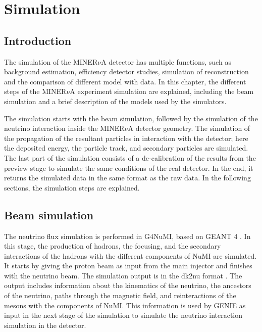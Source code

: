 \chapter{Simulation}
\minitoc
\label{Cap:Simulation}

\section{Introduction}
\label{Cap:Simulation:Introduction}
The simulation of the MINER$\nu$A detector has multiple functions, such as background estimation, efficiency detector studies, simulation of reconstruction and the comparison of different  model with data. In this chapter, the different steps of the MINER$\nu$A experiment simulation are explained, including the beam simulation and a brief description of the models used by the simulators.

The simulation starts with the beam simulation, followed by the simulation of the neutrino interaction inside the MINER$\nu$A detector geometry. The simulation of the propagation of the resultant particles in interaction with the detector; here the deposited energy, the particle track, and secondary particles are simulated. The last part of the simulation consists of a de-calibration of the results from the preview stage to simulate the same conditions of the real detector. In the end, it returns the simulated data in the same format as the raw data. In the following sections, the simulation steps are explained.

\section{Beam simulation}
\label{Cap:Simulation:BeamSimulation}

The neutrino flux simulation is performed in G4NuMI, based on GEANT 4 \cite{GEANT4}. In this stage, the production of hadrons, the focusing, and the secondary interactions of the hadrons with the different components of NuMI are simulated. It starts by giving the proton beam as input from the main injector and finishes with the neutrino beam. The simulation output is in the dk2nu format \cite{dk2nu}. The output includes information about the kinematics of the neutrino, the ancestors of the neutrino, paths through the magnetic field, and reinteractions of the mesons with the components of NuMI. This information is used by GENIE \cite{Genie} as input in the next stage of the simulation to simulate the neutrino interaction simulation in the detector.
 
